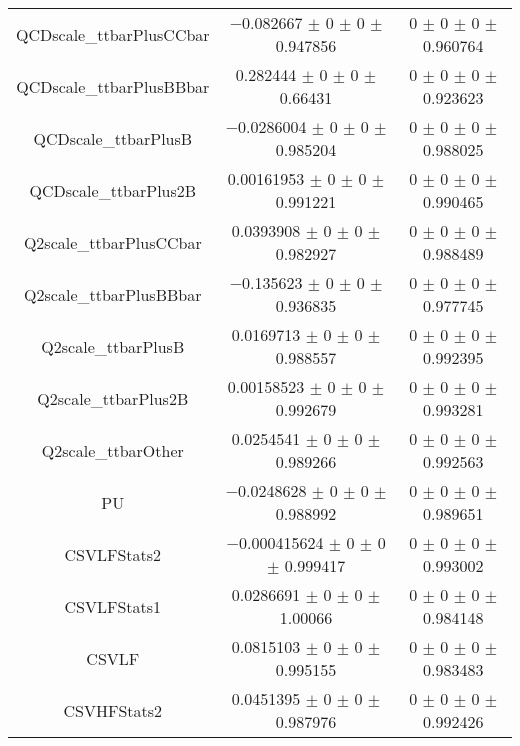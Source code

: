 \begin{table}
\begin{tabular}{ccc}
QCDscale\_ttbarPlusCCbar & \num{-0.082667} $\pm$ \num{0} $\pm$ \num{0} $\pm$ \num{0.947856} & \num{0} $\pm$ \num{0} $\pm$ \num{0} $\pm$ \num{0.960764}\\
QCDscale\_ttbarPlusBBbar & \num{0.282444} $\pm$ \num{0} $\pm$ \num{0} $\pm$ \num{0.66431} & \num{0} $\pm$ \num{0} $\pm$ \num{0} $\pm$ \num{0.923623}\\
QCDscale\_ttbarPlusB & \num{-0.0286004} $\pm$ \num{0} $\pm$ \num{0} $\pm$ \num{0.985204} & \num{0} $\pm$ \num{0} $\pm$ \num{0} $\pm$ \num{0.988025}\\
QCDscale\_ttbarPlus2B & \num{0.00161953} $\pm$ \num{0} $\pm$ \num{0} $\pm$ \num{0.991221} & \num{0} $\pm$ \num{0} $\pm$ \num{0} $\pm$ \num{0.990465}\\
Q2scale\_ttbarPlusCCbar & \num{0.0393908} $\pm$ \num{0} $\pm$ \num{0} $\pm$ \num{0.982927} & \num{0} $\pm$ \num{0} $\pm$ \num{0} $\pm$ \num{0.988489}\\
Q2scale\_ttbarPlusBBbar & \num{-0.135623} $\pm$ \num{0} $\pm$ \num{0} $\pm$ \num{0.936835} & \num{0} $\pm$ \num{0} $\pm$ \num{0} $\pm$ \num{0.977745}\\
Q2scale\_ttbarPlusB & \num{0.0169713} $\pm$ \num{0} $\pm$ \num{0} $\pm$ \num{0.988557} & \num{0} $\pm$ \num{0} $\pm$ \num{0} $\pm$ \num{0.992395}\\
Q2scale\_ttbarPlus2B & \num{0.00158523} $\pm$ \num{0} $\pm$ \num{0} $\pm$ \num{0.992679} & \num{0} $\pm$ \num{0} $\pm$ \num{0} $\pm$ \num{0.993281}\\
Q2scale\_ttbarOther & \num{0.0254541} $\pm$ \num{0} $\pm$ \num{0} $\pm$ \num{0.989266} & \num{0} $\pm$ \num{0} $\pm$ \num{0} $\pm$ \num{0.992563}\\
PU & \num{-0.0248628} $\pm$ \num{0} $\pm$ \num{0} $\pm$ \num{0.988992} & \num{0} $\pm$ \num{0} $\pm$ \num{0} $\pm$ \num{0.989651}\\
CSVLFStats2 & \num{-0.000415624} $\pm$ \num{0} $\pm$ \num{0} $\pm$ \num{0.999417} & \num{0} $\pm$ \num{0} $\pm$ \num{0} $\pm$ \num{0.993002}\\
CSVLFStats1 & \num{0.0286691} $\pm$ \num{0} $\pm$ \num{0} $\pm$ \num{1.00066} & \num{0} $\pm$ \num{0} $\pm$ \num{0} $\pm$ \num{0.984148}\\
CSVLF & \num{0.0815103} $\pm$ \num{0} $\pm$ \num{0} $\pm$ \num{0.995155} & \num{0} $\pm$ \num{0} $\pm$ \num{0} $\pm$ \num{0.983483}\\
CSVHFStats2 & \num{0.0451395} $\pm$ \num{0} $\pm$ \num{0} $\pm$ \num{0.987976} & \num{0} $\pm$ \num{0} $\pm$ \num{0} $\pm$ \num{0.992426}\\

\end{tabular}
\end{table}

